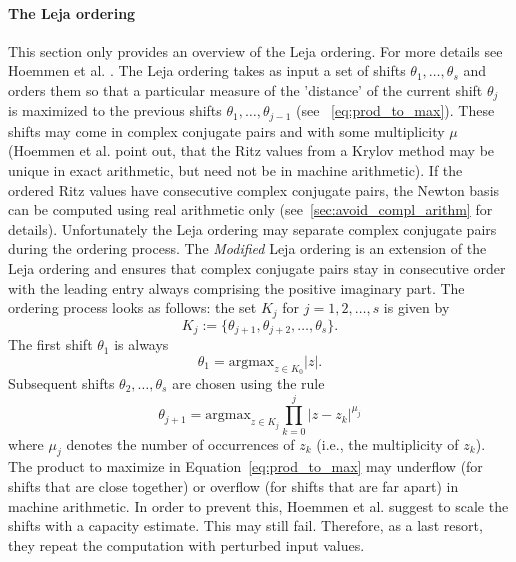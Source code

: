 \documentclass{scrartcl}
\numberwithin{equation}{section}
\begin{document}

\paragraph{The Leja ordering}
This section only provides an overview of the Leja ordering. For more details see Hoemmen et al. \cite{Hoemmen:2010:CKS:1970638}.
 The Leja ordering takes as input a set of shifts $\theta_1, \ldots, \theta_s$ and orders them so that a particular measure of the 'distance' of the current shift $\theta_j$ is maximized to the previous shifts $\theta_1, \ldots, \theta_{j - 1}$ (see ~\eqref{eq:prod_to_max}). These shifts may come in complex conjugate pairs and with some multiplicity $\mu$ (Hoemmen et al. \cite{Hoemmen:2010:CKS:1970638} point out, that the Ritz values from a Krylov method may be unique in exact arithmetic, but need not be in machine arithmetic). If the ordered Ritz values have consecutive complex conjugate pairs, the Newton basis can be computed using real arithmetic only (see~\ref{sec:avoid_compl_arithm} for details). Unfortunately the Leja ordering may separate complex conjugate pairs during the ordering process. The \textit{Modified} Leja ordering is an extension of the Leja ordering and ensures that complex conjugate pairs stay in consecutive order with the leading entry always comprising the positive imaginary part. The ordering process looks as follows: the set $K_j$ for $j = 1,2, \ldots, s$ is given by
\begin{equation}
K_j := \{\theta_{j + 1}, \theta_{j + 2}, \ldots, \theta_s\}.
\end{equation}
The first shift $\theta_1$ is always
\begin{equation}
\theta_1 = \text{argmax}_{z \in K_0} |z|.
\end{equation}
Subsequent shifts $\theta_2, \ldots, \theta_s$ are chosen using the rule
\begin{equation}\label{eq:prod_to_max}
\theta_{j + 1} = \text{argmax}_{z \in K_j} \prod_{k = 0}^j |z - z_k|^{\mu_j}
\end{equation}
where $\mu_j$ denotes the number of occurrences of $z_k$ (i.e., the multiplicity of $z_k$).
The product to maximize in Equation~\eqref{eq:prod_to_max} may underflow (for shifts that are close together) or overflow (for shifts that are far apart) in machine arithmetic. In order to prevent this, Hoemmen et al. \cite{Hoemmen:2010:CKS:1970638} suggest to scale the shifts with a capacity estimate. This may still fail. Therefore, as a last resort, they repeat the computation with perturbed input values.
\end{document}
